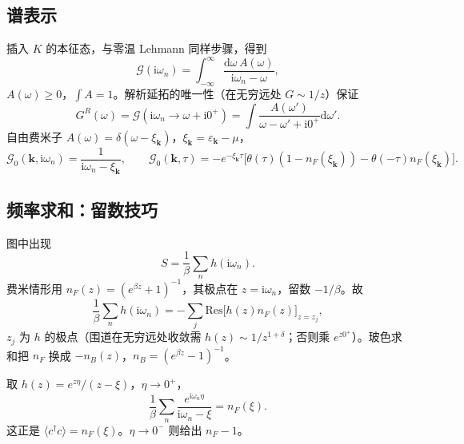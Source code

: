 \subsection{谱表示}

插入 $K$ 的本征态，与零温 Lehmann 同样步骤，得到
\begin{equation}
  \mathcal{G}(\mathrm{i}\omega_n)
  =\int_{-\infty}^{\infty}
  \frac{\mathrm{d}\omega\,A(\omega)}{\mathrm{i}\omega_n-\omega},
\label{eq:G_spectral}
\end{equation}
$A(\omega)\ge0$，$\int A=1$。解析延拓的唯一性（在无穷远处 $G\sim 1/z$）保证
\begin{equation}
  G^R(\omega)
  =\mathcal{G}(\mathrm{i}\omega_n\to\omega+\mathrm{i}0^+)
  =\int\frac{A(\omega')}{\omega-\omega'+\mathrm{i}0^+}\mathrm{d}\omega'.
\end{equation}
自由费米子 $A(\omega)=\delta(\omega-\xi_{\mathbf{k}})$，$\xi_{\mathbf{k}}=\varepsilon_{\mathbf{k}}-\mu$，
\begin{equation}
  \mathcal{G}_0(\mathbf{k},\mathrm{i}\omega_n)
  =\frac{1}{\mathrm{i}\omega_n-\xi_{\mathbf{k}}},
  \qquad
  \mathcal{G}_0(\mathbf{k},\tau)
  =-e^{-\xi_{\mathbf{k}}\tau}
  \bigl[\theta(\tau)(1-n_F(\xi_{\mathbf{k}}))
  -\theta(-\tau)n_F(\xi_{\mathbf{k}})\bigr].
\label{eq:G0_tau}
\end{equation}

\subsection{频率求和：留数技巧}

图中出现
\begin{equation}
  S=\frac{1}{\beta}\sum_n
  h(\mathrm{i}\omega_n).
\end{equation}
费米情形用 $n_F(z)=(e^{\beta z}+1)^{-1}$，其极点在 $z=\mathrm{i}\omega_n$，留数 $-1/\beta$。故
\begin{equation}
  \frac{1}{\beta}\sum_n h(\mathrm{i}\omega_n)
  =-\sum_j\mathrm{Res}\bigl[h(z)n_F(z)\bigr]_{z=z_j},
\label{eq:matsum_F}
\end{equation}
$z_j$ 为 $h$ 的极点（围道在无穷远处收敛需 $h(z)\sim 1/z^{1+\delta}$；否则乘 $e^{z0^+}$）。玻色求和把 $n_F$ 换成 $-n_B(z)$，$n_B=(e^{\beta z}-1)^{-1}$。

\begin{example}[占据数]
取 $h(z)=e^{z\eta}/(z-\xi)$，$\eta\to0^+$，
\begin{equation}
  \frac{1}{\beta}\sum_n
  \frac{e^{\mathrm{i}\omega_n\eta}}{\mathrm{i}\omega_n-\xi}
  =n_F(\xi).
\end{equation}
这正是 $\langle c^\dagger c\rangle=n_F(\xi)$。$\eta\to0^-$ 则给出 $n_F-1$。
\end{example}

